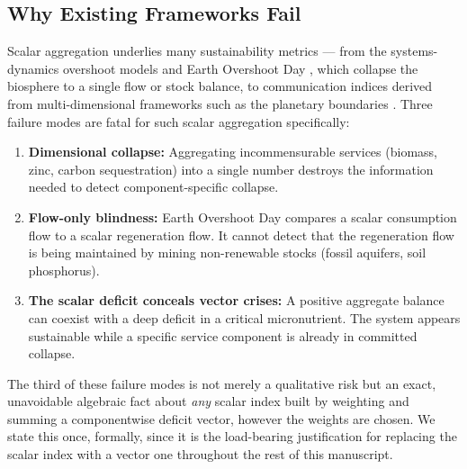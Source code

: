 \documentclass[twocolumn,10pt]{article}
\begin{document}
\subsection{Why Existing Frameworks Fail}
\label{sec:why-frameworks-fail}
Scalar aggregation underlies many sustainability metrics --- from the systems-dynamics overshoot models \cite{meadows1972} and Earth Overshoot Day \cite{lin2018,wackernagel2019,blomqvist2013}, which collapse the biosphere to a single flow or stock balance, to communication indices derived from multi-dimensional frameworks such as the planetary boundaries \cite{rockstrom2009,steffen2015}. Three failure modes are fatal for such scalar aggregation specifically:
\begin{enumerate}
\item \textbf{Dimensional collapse:} Aggregating incommensurable services (biomass, zinc, carbon sequestration)
      into a single number destroys the information needed to detect component-specific collapse.
\item \textbf{Flow-only blindness:} Earth Overshoot Day compares a scalar consumption flow to a scalar
      regeneration flow. It cannot detect that the regeneration flow is being maintained by mining
      non-renewable stocks (fossil aquifers, soil phosphorus).
\item \textbf{The scalar deficit conceals vector crises:} A positive aggregate balance can coexist with a deep
      deficit in a critical micronutrient. The system appears sustainable while a specific service component is
      already in committed collapse.
\end{enumerate}
The third of these failure modes is not merely a qualitative risk but an exact, unavoidable algebraic fact about \emph{any} scalar index built by weighting and summing a componentwise deficit vector, however the weights are chosen. We state this once, formally, since it is the load-bearing justification for replacing the scalar index with a vector one throughout the rest of this manuscript.
\end{document}
